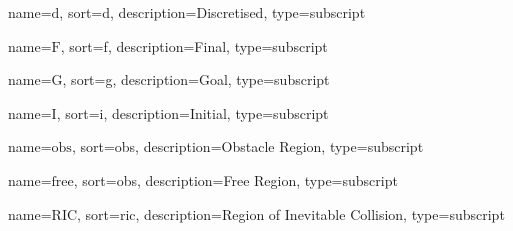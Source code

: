 	{%
		name={\ensuremath{\mathrm{d}}},
		sort=d,
		description=Discretised,
		type=subscript
	}
	\newcommand{\discrete}{\gls{sub:discrete}}

	{%
		name={\ensuremath{\mathrm{F}}},
		sort=f,
		description=Final,
		type=subscript
	}
	\newcommand{\final}{\gls{sub:final}}

	{%
		name={\ensuremath{\mathrm{G}}},
		sort=g,
		description=Goal,
		type=subscript
	}
	\newcommand{\goal}{\gls{sub:goal}}

	{%
		name={\ensuremath{\mathrm{I}}},
		sort=i,
		description=Initial,
		type=subscript
	}
	\newcommand{\initial}{\gls{sub:initial}}

	{%
		name={\ensuremath{\mathrm{obs}}},
		sort=obs,
		description=Obstacle Region,
		type=subscript
	}
	\newcommand{\obstacleregion}{\gls{sub:obstacleregion}}

	{%
		name={\ensuremath{\mathrm{free}}},
		sort=obs,
		description=Free Region,
		type=subscript
	}
	\newcommand{\freeregion}{\gls{sub:freeregion}}

	{%
		name={\ensuremath{\mathrm{RIC}}},
		sort=ric,
		description=Region of Inevitable Collision,
		type=subscript
	}
	\newcommand{\regionOfInevitableCollision}{\gls{sub:regionOfInevitableCollision}}

